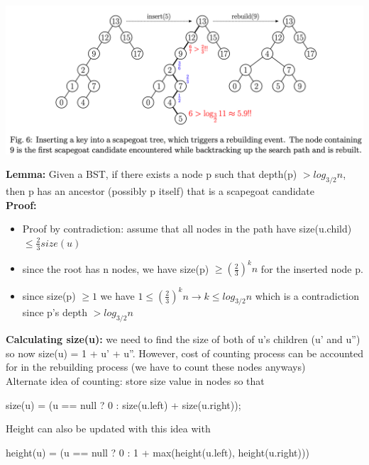 \documentclass{article}
\begin{document}
  \begin{center}
  \includegraphics[scale=0.15]{ScapegoatInsertion}
  \end{center}
  \textbf{Lemma: } Given a BST, if there exists a node p such that depth(p) $> log_{3/2}n$, then p has an ancestor (possibly p itself) that is a scapegoat candidate\\
  \textbf{Proof: }
  \begin{itemize}[noitemsep]
    \item Proof by contradiction: assume that all nodes in the path have size(u.child)$\leq \frac{2}{3} size(u)$
    \item since the root has n nodes, we have size(p) $\geq (\frac{2}{3})^{k}n$ for the inserted node p. 
    \item since size(p) $\geq 1$ we have $1 \leq (\frac{2}{3})^{k}n \rightarrow k \leq log_{3/2}n$ which is a contradiction since p's depth $ > log_{3/2}n$ \\ 
  \end{itemize}
  \textbf{Calculating size(u): }we need to find the size of both of u's children (u' and u'') so now size(u) = 1 + u' + u''. However, cost of counting process can be accounted for in the rebuilding process (we have to count these nodes anyways)\\
  Alternate idea of counting: store size value in nodes so that
  \begin{center}
    size(u) = (u == null ? 0 : size(u.left) + size(u.right));
  \end{center}
  Height can also be updated with this idea with
\begin{center}
  height(u) = (u == null ? 0 : 1 + max(height(u.left), height(u.right)))
  \end{center}
  \newpage
\end{document}
